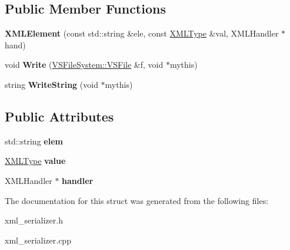 \subsection*{Public Member Functions}
\begin{DoxyCompactItemize}
\item 
{\bfseries X\+M\+L\+Element} (const std\+::string \&ele, const \hyperlink{structXMLType}{X\+M\+L\+Type} \&val, X\+M\+L\+Handler $\ast$hand)\hypertarget{structXMLElement_a25fb4e17df31751279cd031ebb761000}{}\label{structXMLElement_a25fb4e17df31751279cd031ebb761000}

\item 
void {\bfseries Write} (\hyperlink{classVSFileSystem_1_1VSFile}{V\+S\+File\+System\+::\+V\+S\+File} \&f, void $\ast$mythis)\hypertarget{structXMLElement_abd1a5c53c03d4f9f33aae6b1a3f13d96}{}\label{structXMLElement_abd1a5c53c03d4f9f33aae6b1a3f13d96}

\item 
string {\bfseries Write\+String} (void $\ast$mythis)\hypertarget{structXMLElement_a77ed210d573160593fdc6978989bc8e9}{}\label{structXMLElement_a77ed210d573160593fdc6978989bc8e9}

\end{DoxyCompactItemize}
\subsection*{Public Attributes}
\begin{DoxyCompactItemize}
\item 
std\+::string {\bfseries elem}\hypertarget{structXMLElement_a9e5f8aa3943b48728120f85032dacc5f}{}\label{structXMLElement_a9e5f8aa3943b48728120f85032dacc5f}

\item 
\hyperlink{structXMLType}{X\+M\+L\+Type} {\bfseries value}\hypertarget{structXMLElement_ab6adc2d0eee78fea0e2e5152074815e7}{}\label{structXMLElement_ab6adc2d0eee78fea0e2e5152074815e7}

\item 
X\+M\+L\+Handler $\ast$ {\bfseries handler}\hypertarget{structXMLElement_a67d5f8e47ae9f4530733a367f8c3e336}{}\label{structXMLElement_a67d5f8e47ae9f4530733a367f8c3e336}

\end{DoxyCompactItemize}


The documentation for this struct was generated from the following files\+:\begin{DoxyCompactItemize}
\item 
xml\+\_\+serializer.\+h\item 
xml\+\_\+serializer.\+cpp\end{DoxyCompactItemize}
